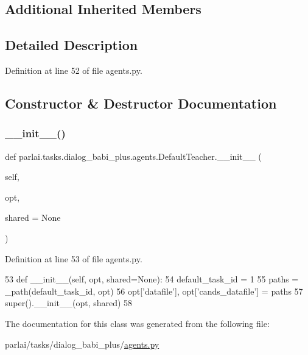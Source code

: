 \subsection*{Additional Inherited Members}


\subsection{Detailed Description}


Definition at line 52 of file agents.\+py.



\subsection{Constructor \& Destructor Documentation}
\mbox{\label{classparlai_1_1tasks_1_1dialog__babi__plus_1_1agents_1_1DefaultTeacher_a672986e909678e098b1315a614611c32}} 
\subsubsection{\texorpdfstring{\+\_\+\+\_\+init\+\_\+\+\_\+()}{\_\_init\_\_()}}
{\footnotesize\ttfamily def parlai.\+tasks.\+dialog\+\_\+babi\+\_\+plus.\+agents.\+Default\+Teacher.\+\_\+\+\_\+init\+\_\+\+\_\+ (\begin{DoxyParamCaption}\item[{}]{self,  }\item[{}]{opt,  }\item[{}]{shared = {\ttfamily None} }\end{DoxyParamCaption})}



Definition at line 53 of file agents.\+py.


\begin{DoxyCode}
53     \textcolor{keyword}{def }\_\_init\_\_(self, opt, shared=None):
54         default\_task\_id = 1
55         paths = \_path(default\_task\_id, opt)
56         opt[\textcolor{stringliteral}{'datafile'}], opt[\textcolor{stringliteral}{'cands\_datafile'}] = paths
57         super().\_\_init\_\_(opt, shared)
58 \end{DoxyCode}


The documentation for this class was generated from the following file\+:\begin{DoxyCompactItemize}
\item 
parlai/tasks/dialog\+\_\+babi\+\_\+plus/\hyperlink{parlai_2tasks_2dialog__babi__plus_2agents_8py}{agents.\+py}\end{DoxyCompactItemize}
